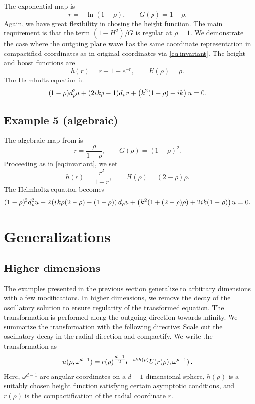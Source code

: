 \documentclass[draft,onefignum,onetabnum]{siamart190516}
\newcommand{\be}{\begin{equation}}
\newcommand{\ee}{\end{equation}}
\newcommand{\iu}{{i\mkern1mu}}
\begin{document}
The exponential map is
\be\label{eq:ex4_mapping} r = -\ln(1-\rho), \qquad G(\rho) = 1-\rho. \ee
Again, we have great flexibility in chosing the height function. The main requirement is that the term $(1-H^2)/G$ is regular at $\rho=1$. We demonstrate the case where the outgoing plane wave has the same coordinate representation in compactified coordinates as in original coordinates via \eqref{eq:invariant}. The height and boost functions are
\[ h(r) = r - 1 + e^{-r}, \qquad H(\rho) = \rho. \]
The Helmholtz equation is
\[  (1-\rho) d_\rho^2 u + (2 \iu k \rho - 1) d_\rho u + \left(k^2(1+\rho) + \iu k \right) u = 0. \]

\subsection{Example 5 (algebraic)}
The algebraic map from \cite{GroschOrszag77} is
\be\label{eq:ext_mapping} r = \frac{\rho}{1-\rho}, \qquad G(\rho) = (1-\rho)^2. \ee
Proceeding as in \eqref{eq:invariant}, we set
\[ h(r) = \frac{r^2}{1+r},\qquad H(\rho) = (2-\rho)\rho.\]
The Helmholtz equation becomes
\[ (1-\rho)^2 d_\rho^2 u + 2 \left( \iu k \rho (2-\rho) - (1-\rho) \right)d_\rho u + \left( k^2 (1+(2-\rho)\rho) + 2 \iu k (1-\rho)  \right) u = 0. \]

\section{Generalizations}\label{sec:nic_general}


\subsection{Higher dimensions}\label{sec:high_d}
The examples presented in the previous section generalize to arbitrary dimensions with a few modifications. In higher dimensions, we remove the decay of the oscillatory solution to ensure regularity of the transformed equation. The transformation is performed along the outgoing direction towards infinity. We summarize the transformation with the following directive: Scale out the oscillatory decay in the radial direction and compactify. We write the transformation as
\be\label{eq:summary} u(\rho, \omega^{d-1}) = r(\rho)^{\tfrac{d-1}{2}} e^{-\iu k h(\rho)} U(r(\rho), \omega^{d-1})\,.\ee
Here, $\omega^{d-1}$ are angular coordinates on a $d-1$ dimensional sphere, $h(\rho)$ is a suitably chosen height function satisfying certain asymptotic conditions, and $r(\rho)$ is the compactification of the radial coordinate $r$. 
\end{document}
